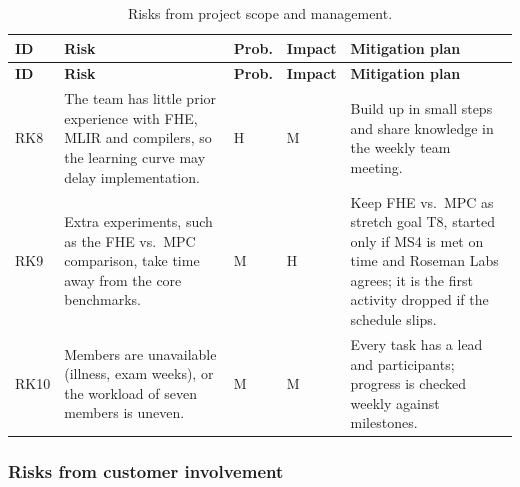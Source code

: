 \begingroup
\small
\renewcommand{\arraystretch}{1.25}
\begin{longtable}{
  >{\raggedright\arraybackslash}p{}
  >{\raggedright\arraybackslash}p{}
  >{\centering\arraybackslash}p{}
  >{\centering\arraybackslash}p{}
  >{\raggedright\arraybackslash}p{}}
\caption{Risks from project scope and management.}\label{tab:risk-scope}\\
\toprule
\textbf{ID} & \textbf{Risk} & \textbf{Prob.} & \textbf{Impact} & \textbf{Mitigation plan}\\
\midrule
\endfirsthead
\toprule
\textbf{ID} & \textbf{Risk} & \textbf{Prob.} & \textbf{Impact} & \textbf{Mitigation plan}\\
\midrule
\endhead
\bottomrule
\endfoot


RK8 &
The team has little prior experience with FHE, MLIR and compilers, so the learning curve may delay implementation. &
H & M &
Build up in small steps and share knowledge in the weekly team meeting.
\\ \midrule

RK9 &
Extra experiments, such as the FHE vs.\ MPC comparison, take time away from the core benchmarks. &
M & H &
Keep FHE vs.\ MPC as stretch goal T8, started only if MS4 is met on time and Roseman Labs agrees; it is the first activity dropped if the schedule slips.
\\ \midrule


RK10 &
Members are unavailable (illness, exam weeks), or the workload of seven members is uneven. &
M & M &
Every task has a lead and participants; progress is checked weekly against milestones.


\end{longtable}
\endgroup

\subsubsection*{Risks from customer involvement}


